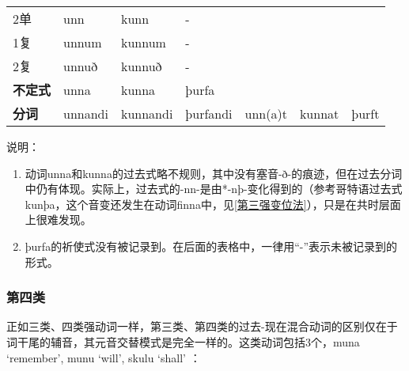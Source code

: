 \begin{longtable}{lllllll}
    2单           & unn                    & kunn                   & -        & ~       & ~      & ~       \\
    1复           & unnum                  & kunnum                 & -        & ~       & ~      & ~       \\
    2复           & unnuð                  & kunnuð                 & -        & ~       & ~      & ~       \\
    \textbf{不定式} & unna                   & kunna                  & þurfa    & ~       & ~      & ~       \\
    \textbf{分词}  & unnandi                & kunnandi               & þurfandi & unn(a)t & kunnat &
    þurft                                                                                                  \\
\end{longtable}


说明：


\begin{enumerate}

    \item
          动词unna和kunna的过去式略不规则，其中没有塞音-ð-的痕迹，但在过去分词中仍有体现。实际上，过去式的-nn-是由*-nþ-变化得到的（参考哥特语过去式kunþa，这个音变还发生在动词finna中，见\ref{第三强变位法}），只是在共时层面上很难发现。
    \item
          þurfa的祈使式没有被记录到。在后面的表格中，一律用``-''表示未被记录到的形式。
\end{enumerate}

\subsubsection{第四类}

正如三类、四类强动词一样，第三类、第四类的过去-现在混合动词的区别仅在于词干尾的辅音，其元音交替模式是完全一样的。这类动词包括3个，muna
`remember‌', munu `will‌', skulu `shall‌' ：

